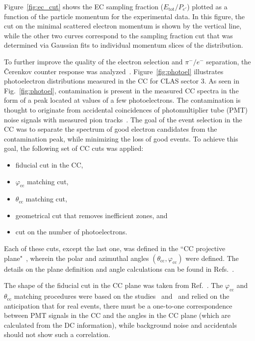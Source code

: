 \documentclass[prc,twocolumn,superscriptaddress,showpacs,amssymb,amsmath,amsfonts,aps,nofootinbib]{revtex4-1}
\begin{document}
Figure~\ref{fig:ec_cut} shows the EC sampling fraction ($E_{\text{tot}}/P_{e'}$) plotted as a function of the particle momentum for the experimental data. In this figure, the cut on the minimal scattered electron momentum is shown by the vertical line, while the other two curves correspond to the sampling fraction cut that was determined via Gaussian fits to individual momentum slices of the distribution.




To further improve the quality of the electron selection and $\pi^{-}/e^{-}$ separation, the \v Cerenkov counter response was analyzed~\cite{Adams:2001kk}. Figure~\ref{fig:photoel} illustrates photoelectron distributions measured in the CC for CLAS sector 3.  As seen in Fig.\!~\ref{fig:photoel}, contamination is present in the measured CC spectra in the form of a peak located at values of a few photoelectrons. The contamination is thought to originate from accidental coincidences of photomultiplier tube (PMT) noise signals with measured pion tracks~\cite{Osipenko:2004}. The goal of the event selection in the CC was to separate the spectrum of good electron candidates from the contamination peak, while minimizing the loss of good events. To achieve this goal, the following set of CC cuts was applied: 

\begin{itemize}
\item fiducial cut in the CC,
\item $\varphi_{\text{cc}}$ matching cut,
\item $\theta_{\text{cc}}$ matching cut,\vspace{-0.7em}
\item geometrical cut that removes inefficient zones, and\vspace*{-10.7cm}
\item cut on the number of photoelectrons.
\end{itemize}


Each of these cuts, except the last one, was defined in the ``CC projective plane"~\cite{Osipenko:2004}, wherein the polar and azimuthal angles $(\theta_{\text{cc}},\varphi_{\text{cc}})$ were defined. The details on the plane definition and angle calculations can be found in Refs.\!~\cite{my_an_note:2020,Osipenko:2004}.


The shape of the fiducial cut in the CC plane was taken from Ref.\!~\cite{Khetarpal:2010}. The $\varphi_{\text{cc}}$ and $\theta_{\text{cc}}$ matching procedures were based on the studies~\cite{Osipenko:2004} and~\cite{Ungaro:2010} and relied on the anticipation that for real events, there must be a one-to-one correspondence between PMT signals in the CC and the angles in the CC plane (which are calculated from the DC information), while background noise and accidentals should not show such a correlation.
\end{document}
